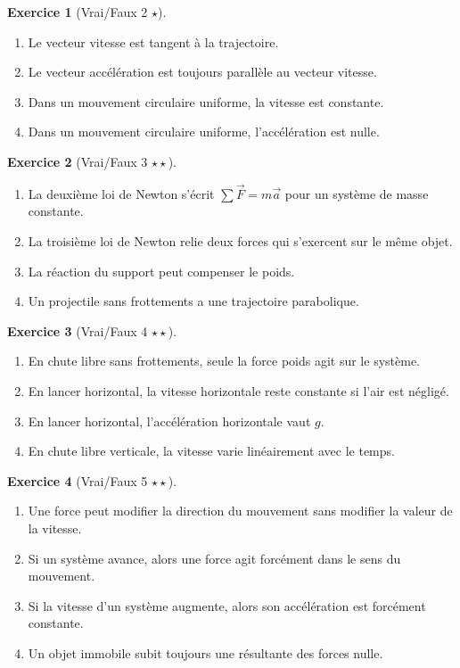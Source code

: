 \documentclass[11pt,a4paper]{article}
\theoremstyle{definition}
\newtheorem{exercice}{Exercice}[section]
\newcommand{\etoiles}[1]{\hfill{\small\textbf{#1}}}
\begin{document}
\begin{exercice}[Vrai/Faux 2 \etoiles{$\star$}]
\begin{enumerate}[label=\alph*)]
    \item Le vecteur vitesse est tangent à la trajectoire.
    \item Le vecteur accélération est toujours parallèle au vecteur vitesse.
    \item Dans un mouvement circulaire uniforme, la vitesse est constante.
    \item Dans un mouvement circulaire uniforme, l’accélération est nulle.
\end{enumerate}
\end{exercice}

\begin{exercice}[Vrai/Faux 3 \etoiles{$\star\star$}]
\begin{enumerate}[label=\alph*)]
    \item La deuxième loi de Newton s’écrit $\sum \vec{F}=m\vec{a}$ pour un système de masse constante.
    \item La troisième loi de Newton relie deux forces qui s’exercent sur le même objet.
    \item La réaction du support peut compenser le poids.
    \item Un projectile sans frottements a une trajectoire parabolique.
\end{enumerate}
\end{exercice}

\begin{exercice}[Vrai/Faux 4 \etoiles{$\star\star$}]
\begin{enumerate}[label=\alph*)]
    \item En chute libre sans frottements, seule la force poids agit sur le système.
    \item En lancer horizontal, la vitesse horizontale reste constante si l’air est négligé.
    \item En lancer horizontal, l’accélération horizontale vaut $g$.
    \item En chute libre verticale, la vitesse varie linéairement avec le temps.
\end{enumerate}
\end{exercice}

\begin{exercice}[Vrai/Faux 5 \etoiles{$\star\star$}]
\begin{enumerate}[label=\alph*)]
    \item Une force peut modifier la direction du mouvement sans modifier la valeur de la vitesse.
    \item Si un système avance, alors une force agit forcément dans le sens du mouvement.
    \item Si la vitesse d’un système augmente, alors son accélération est forcément constante.
    \item Un objet immobile subit toujours une résultante des forces nulle.
\end{enumerate}
\end{exercice}
\end{document}
